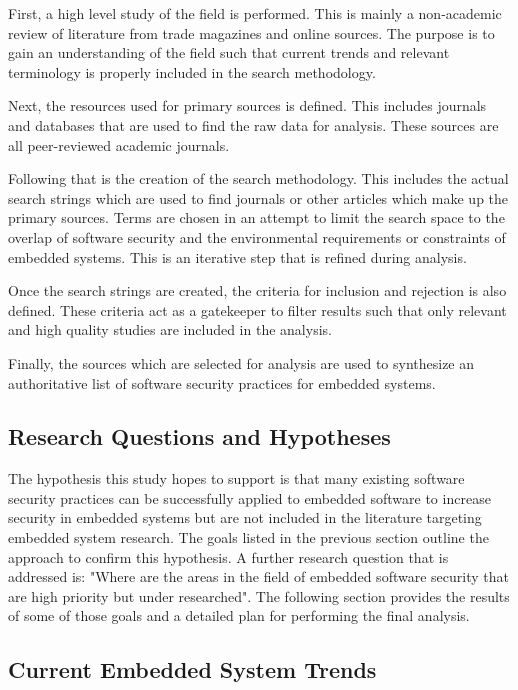 \documentclass[final,conference,10pt]{IEEEtran}
\begin{document}
First, a high level study of the field is performed.  This is mainly a non-academic review of literature from trade magazines and online sources. The purpose is to gain an understanding of the field such that current trends and relevant terminology is properly included in the search methodology.

Next, the resources used for primary sources is defined.  This includes journals and databases that are used to find the raw data for analysis.  These sources are all peer-reviewed academic journals.

Following that is the creation of the search methodology.  This includes the actual search strings which are used to find journals or other articles which make up the primary sources.  Terms are chosen in an attempt to limit the search space to the overlap of software security and the environmental requirements or constraints of embedded systems.  This is an iterative step that is refined during analysis.

Once the search strings are created, the criteria for inclusion and rejection is also defined.  These criteria act as a gatekeeper to filter results such that only relevant and high quality studies are included in the analysis.

Finally, the sources which are selected for analysis are used to synthesize an authoritative list of software security practices for embedded systems.  

\subsection{Research Questions and Hypotheses}

The hypothesis this study hopes to support is that many existing software security practices can be successfully applied to embedded software to increase security in embedded systems but are not included in the literature targeting embedded system research.  The goals listed in the previous section outline the approach to confirm this hypothesis.  A further research question that is addressed is: "Where are the areas in the field of embedded software security that are high priority but under researched". The following section provides the results of some of those goals and a detailed plan for performing the final analysis.

\subsection{Current Embedded System Trends}
\end{document}
